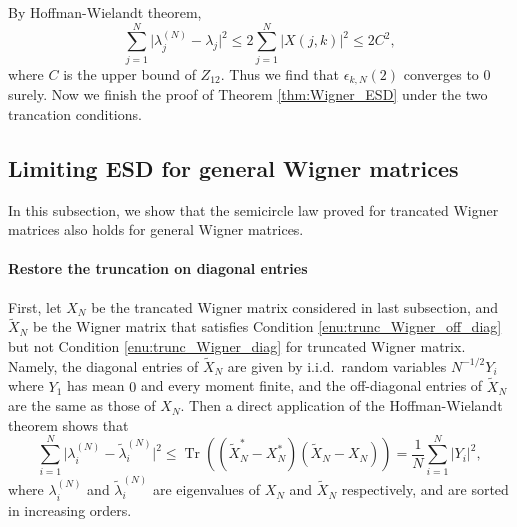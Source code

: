 \documentclass[11pt, a4paper]{article}
\numberwithin{equation}{section}
\newcommand{\iid}{i.i.d.}
\DeclareMathOperator{\Tr}{Tr}
\theoremstyle{definition}
\theoremstyle{remark}
\begin{document}
By Hoffman-Wielandt theorem,
\begin{equation}
  \sum^N_{j = 1} \lvert \lambda^{(N)}_j - \lambda_j \rvert^2 \leq 2 \sum^N_{j = 1} \lvert X(j, k) \rvert^2 \leq 2C^2,
\end{equation}
where $C$ is the upper bound of $Z_{12}$. Thus we find that $\epsilon_{k, N}(2)$ converges to $0$ surely. Now we finish the proof of Theorem \ref{thm:Wigner_ESD} under the two trancation conditions.

\subsection{Limiting ESD for general Wigner matrices}

In this subsection, we show that the semicircle law proved for trancated Wigner matrices also holds for general Wigner matrices.

\paragraph{Restore the truncation on diagonal entries}

First, let $X_N$ be the trancated Wigner matrix considered in last subsection, and $\tilde{X}_N$ be the Wigner matrix that satisfies Condition \ref{enu:trunc_Wigner_off_diag} but not Condition \ref{enu:trunc_Wigner_diag} for truncated Wigner matrix. Namely, the diagonal entries of $\tilde{X}_N$ are given by \iid\ random variables $N^{-1/2} Y_i$ where $Y_1$ has mean $0$ and every moment finite, and the off-diagonal entries of $\tilde{X}_N$ are the same as those of $X_N$. Then a direct application of the Hoffman-Wielandt theorem shows that
\begin{equation}
  \sum^N_{i = 1} \lvert \lambda^{(N)}_i - \tilde{\lambda}^{(N)}_i \rvert^2 \leq \Tr((\tilde{X}^*_N - X^*_N)(\tilde{X}_N - X_N)) = \frac{1}{N} \sum^N_{i = 1} \lvert Y_i \rvert^2,
\end{equation}
where $\lambda^{(N)}_i$ and $\tilde{\lambda}^{(N)}_i$ are eigenvalues of $X_N$ and $\tilde{X}_N$ respectively, and are sorted in increasing orders.
\end{document}
